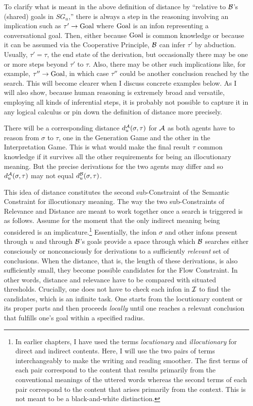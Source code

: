 To clarify what is meant in the above definition of distance by ``relative to $\cal B$'s (shared) goals in $SG_u$,'' there is always a step in the reasoning involving an implication such as $\tau' \rightarrow \hbox{Goal}$ where $\hbox{Goal}$ is an infon representing a conversational goal. Then, either because $\hbox{Goal}$ is common knowledge or because it can be assumed via the Cooperative Principle, $\cal B$ can infer $\tau'$ by abduction. Usually, $\tau' = \tau$, the end state of the derivation, but occasionally there may be one or more steps beyond $\tau'$ to $\tau$. Also, there may be other such implications like, for example, $\tau'' \rightarrow \hbox{Goal}$, in which case $\tau''$ could be another conclusion reached by the search. This will become clearer when I discuss concrete examples below. As I will also show, because human reasoning is extremely broad and versatile, employing all kinds of inferential steps, it is probably not possible to capture it in any logical calculus or pin down the definition of distance more precisely.

There will be a corresponding distance $d^{\cal A}_u(\sigma, \tau)$ for $\cal A$ as both agents have to reason from $\sigma$ to $\tau$, one in the Generation Game and the other in the Interpretation Game. This is what would make the final result $\tau$ common knowledge if it survives all the other requirements for being an illocutionary meaning. But the precise derivations for the two agents may differ and so $d^{\cal A}_u(\sigma, \tau)$ may not equal $d^{\cal B}_u(\sigma, \tau)$. 

This idea of distance constitutes the second sub-Constraint of the Semantic Constraint for illocutionary meaning. The way the two sub-Constraints of Relevance and Distance are meant to work together once a search is triggered is as follows. Assume for the moment that the only indirect meaning being considered is an implicature.\footnote{In earlier chapters, I have used the terms \emph{locutionary} and \emph{illocutionary} for direct and indirect contents. Here, I will use the two pairs of terms interchangeably to make the writing and reading smoother. The first terms of each pair correspond to the content that results primarily from the conventional meanings of the uttered words whereas the second terms of each pair correspond to the content that arises primarily from the context. This is not meant to be a black-and-white distinction.} Essentially, the infon $\sigma$ and other infons present through $u$ and through $\cal B$'s goals provide a space through which $\cal B$ searches either consciously or nonconsciously for derivations to a sufficiently \emph{relevant} set of conclusions. When the distance, that is, the length of these derivations, is also sufficiently small, they become possible candidates for the Flow Constraint. In other words, distance and relevance have to be compared with situated thresholds. Crucially, one does not have to check each infon in $\cal I$ to find the candidates, which is an infinite task. One starts from the locutionary content or its proper parts and then proceeds \emph{locally} until one reaches a relevant conclusion that fulfills one's goal within a specified radius.

